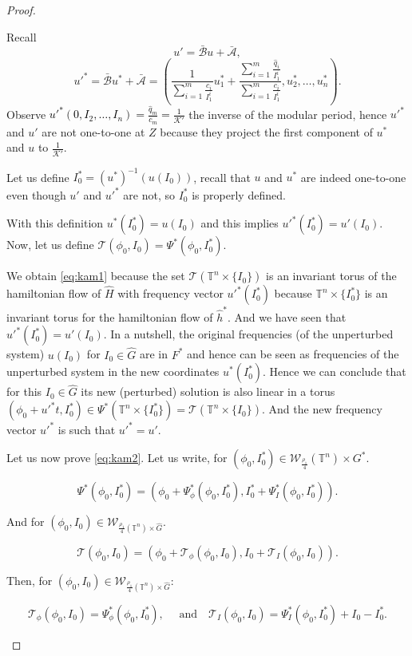 \begin{proof}
\begin{enumerate}
Recall 
$$u' = \bar{\mathcal{B}} u + \bar{\mathcal{A}},$$ 
$$u'^* = \bar{\mathcal{B}} u^* + \bar{\mathcal{A}} = (\frac{1}{\sum_{i=1}^m\frac{c_i}{I_1^i}} u_1^* +\frac{\sum_{i=1}^m\frac{\hat q_i}{I_1^i}}{\sum_{i=1}^m\frac{c_i}{I_1^i}}, u_2^*, \ldots, u_n^*).$$
Observe \textcolor{black}{$u'^*(0,I_2,\ldots,I_n) = \frac{\hat q_m}{c_m} = \frac{1}{\mathcal{K}'}$} the inverse of the modular period, hence $u'^*$ and $u'$ are not one-to-one at $Z$ because they project the first component of $u^*$ and $u$ to \textcolor{black}{$\frac{1}{\mathcal{K}'}$}.

Let us define $I_0^* = (u^* )^{-1}(u(I_0))$, recall that $u$ and $u^* $ are indeed one-to-one even though $u'$ and $u'^*$ are not, so $I_0^*$ is properly defined.

With this definition $u^*(I_0^*) = u(I_0)$ and this implies $u'^*(I_0^*) = u'(I_0)$.
Now, let us define $\mathcal{T}(\phi_0,I_0) = \Psi^*(\phi_0, I_0^*)$.

We obtain \ref{eq:kam1} because the set $\mathcal{T}(\mathbb{T}^n\times\{I_0\})$ is an invariant torus of the hamiltonian flow of $\hat H$ with frequency vector $u'^*(I_0^*)$ because $\mathbb{T}^n\times\{I_0^*\}$ is an invariant torus for the hamiltonian flow of $\hat h^*$. And we have seen that  $u'^*(I_0^*) = u'(I_0)$.
In a nutshell, the original frequencies (of the unperturbed system) $u(I_0)$ for $I_0 \in \hat G$ are in $F^*$ and hence can be seen as frequencies of the unperturbed system in the new coordinates $u^* (I_0^*)$. Hence we can conclude that for this $I_0 \in \hat G$ its new (perturbed) solution is also linear in a torus $(\phi_0 + u'^* t, I_0^*) \in \Psi^*(\mathbb{T}^n\times \{I_0^*\}) = \mathcal{T}(\mathbb{T}^n\times\{I_0\})$. And the new frequency vector $u'^* $ is such that $u'^* = u'$.

Let us now prove \ref{eq:kam2}. Let us write, for $(\phi_0,I_0^* ) \in \mathcal{W}_{\frac{\rho_1}{4}}(\mathbb{T}^n) \times G^*$.

$$\Psi^*(\phi_0,I_0^* ) = (\phi_0 + \Psi_\phi^*(\phi_0, I_0^*), I_0^* + \Psi_I^* (\phi_0,I_0^*)).$$

And for $(\phi_0,I_0) \in \mathcal{W}_{\frac{\rho_1}{4}(\mathbb{T}^n)\times \hat G}$.

$$\mathcal{T}(\phi_0,I_0) = (\phi_0 + \mathcal{T}_\phi(\phi_0,I_0), I_0 + \mathcal{T}_I(\phi_0,I_0)).$$

Then, for $(\phi_0,I_0) \in \mathcal{W}_{\frac{\rho_1}{4}(\mathbb{T}^n)\times \hat G}$:

$$ \mathcal{T}_\phi(\phi_0,I_0) = \Psi^*_\phi(\phi_0, I_0^*), \quad \text{ and} \quad \mathcal{T}_I(\phi_0,I_0) = \Psi^*_I(\phi_0,I_0^*) + I_0 - I_0^*.$$


\end{enumerate}
\end{proof}
